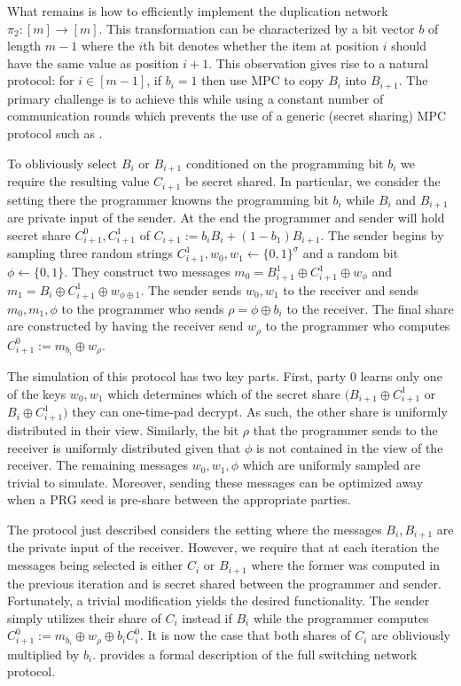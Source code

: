 What remains is how to efficiently implement the duplication network $\pi_2:[m]\rightarrow[m]$. This transformation can be characterized by a bit vector $b$ of length $m-1$ where the $i$th bit denotes whether the item at position $i$ should have the same value as position $i+1$. This observation gives rise to a natural protocol: for $i\in [m-1]$, if $b_i=1$ then use MPC to copy $B_i$ into $B_{i+1}$. The primary challenge is to achieve this while using a constant number of communication rounds which prevents the use of a generic (secret sharing) MPC protocol such as \cite{aby3, highthroughput}.

To obliviously select $B_i$ or $B_{i+1}$ conditioned on the programming bit $b_i$ we require the resulting value $C_{i+1}$ be secret shared. In particular, we consider the setting there the programmer knowns the programming bit $b_i$ while $B_i$ and $B_{i+1}$ are private input of the sender. At the end the programmer and sender will hold secret share $C^0_{i+1}, C_{i+1}^1$ of $C_{i+1}:=b_i B_i + (1-b_1)B_{i+1}$. The sender begins by sampling three random strings $C_{i+1}^1, w_0,w_1\gets \{0,1\}^\sigma$ and a random bit $\phi\gets \{0,1\}$. They construct two messages $m_0=B_{i+1}^1\oplus C_{i+1}^1\oplus w_\phi$ and $m_1= B_i\oplus C_{i+1}^1 \oplus w_{\phi\oplus 1}$. The sender sends $w_0,w_1$ to the receiver and sends $m_0,m_1,\phi$ to the programmer who sends $\rho=\phi\oplus b_i$ to the receiver. The final share are constructed by having the receiver send $w_\rho$ to the programmer who computes $C_{i+1}^0:=m_{b_i}\oplus w_{\rho}$.

The simulation of this protocol has two key parts. First, party 0 learns only one of the keys $w_0,w_1$ which determines which of the secret share $(B_{i+1}\oplus C_{i+1}^1$ or $  B_i\oplus C_{i+1}^1)$ they can one-time-pad decrypt. As such, the other share is uniformly distributed in their view. Similarly, the bit $\rho$ that the programmer sends to the receiver is uniformly distributed given that $\phi$ is not contained in the view of the receiver. The remaining messages $w_0,w_1,\phi$ which are uniformly sampled are trivial to simulate. Moreover, sending these messages can be optimized away when a PRG seed is pre-share between the appropriate parties.

The protocol just described considers the setting where the messages $B_i,B_{i+1}$ are the private input of the receiver. However, we require that at each iteration the messages being selected is either $C_i$ or $B_{i+1}$ where the former was computed in the previous iteration and is secret shared between the programmer and sender. Fortunately, a trivial modification yields the desired functionality. The sender simply utilizes their share of $C_i$ instead if $B_i$ while the programmer computes $C_{i+1}^0:=m_{b_i}\oplus w_{\rho}\oplus b_iC_{i}^0$. It is now the case that both shares of $C_i$ are obliviously multiplied by $b_i$.  provides a formal description of the full switching network protocol.

